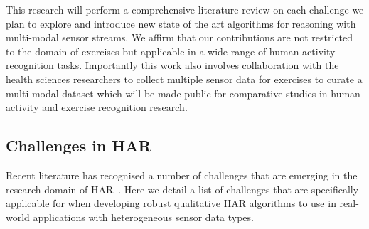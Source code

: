 \documentclass[runningheads]{llncs}
\begin{document}
This research will perform a comprehensive literature review on each challenge we plan to explore and introduce new state of the art algorithms for reasoning with multi-modal sensor streams. We affirm that our contributions are not restricted to the domain of exercises but applicable in a wide range of human activity recognition tasks. 
Importantly this work also involves collaboration with the health sciences researchers to collect multiple sensor data for exercises to curate a multi-modal dataset which will be made public for comparative studies in human activity and exercise recognition research. 

\subsection{Challenges in HAR}
Recent literature has recognised a number of challenges that are emerging in the research domain of HAR~\cite{nweke2018deep,baltruvsaitis2018multimodal,wang2018deep}. Here we detail a list of challenges that are specifically applicable for when developing robust qualitative HAR algorithms to use in real-world applications with heterogeneous sensor data types. 
\end{document}
